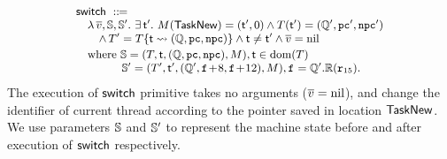 \[
    \small
    \begin{array}{l}
        \primsw \ \define \\
        \quad 
        \lambda \, \args{\val}, \hpstate, \hpstate'. \ 
        \exists \, \thrdid'. \ 
        \Mem(\TaskNew) = (\thrdid', 0) \land 
        \thrdpool(\thrdid') = 
            (\hRstate', \pc', \npc') \\
        \qquad
        \land \,
        \thrdpool' = \thrdpool\{ \thrdid \rightsquigarrow 
            (\hRstate, \pc, \npc) \} 
            \land \tid \neq \tid' \land \args{\val} = \nil \\
        \\[-9pt]
        \quad \text{where} \ 
        \hpstate = 
            (\thrdpool, \thrdid, (\hRstate, \pc, \npc), \Mem), 
        \tid \in \dom(\thrdpool) \\
        \qquad\qquad
        \hpstate' = 
            (\thrdpool', \thrdid', 
                (\hRstate', \lab{}\!+\!8, \lab{}\!+\!12), \Mem), 
                \lab{} = \hRstate'.\hRfile(\reg{15}). 
    \end{array}
\]
The execution of $\mathsf{switch}{}$ primitive takes no arguments 
($\overline{v} = \text{nil}$), and change the identifier 
of current thread according to the pointer saved 
in location $\mathsf{TaskNew}$. We use parameters $\mathbb{S}$ 
and $\mathbb{S}'$ to represent the machine state before 
and after execution of $\mathsf{switch}{}$ respectively. 

